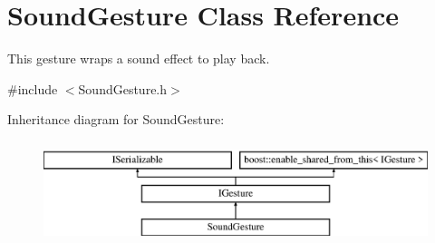 \hypertarget{class_sound_gesture}{}\section{Sound\+Gesture Class Reference}
\label{class_sound_gesture}


This gesture wraps a sound effect to play back.  




{\ttfamily \#include $<$Sound\+Gesture.\+h$>$}

Inheritance diagram for Sound\+Gesture\+:\begin{figure}[H]
\begin{center}
\leavevmode
\includegraphics[height=3.000000cm]{class_sound_gesture}
\end{center}
\end{figure}
